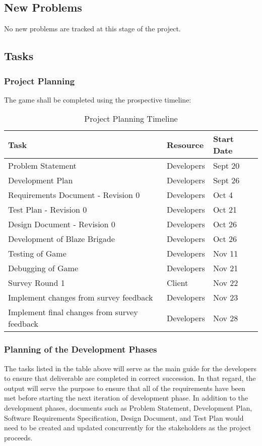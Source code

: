 \documentclass{article}
\begin{document}
\subsection{New Problems}
No new problems are tracked at this stage of the project.

\subsection{Tasks}
\subsubsection{Project Planning}
The game shall be completed using the prospective timeline:

\noindent
\begin{table}[H]
\begin{tabularx}{\textwidth}{llX}
    \toprule
    Task & Resource & Start Date \\
    \midrule
    Problem Statement & Developers  & Sept 20 \\
    Development Plan & Developers  & Sept 26 \\
    Requirements Document - Revision 0 & Developers & Oct 4 \\
    Test Plan - Revision 0 & Developers  & Oct 21 \\
    Design Document - Revision 0 & Developers & Oct 26 \\
    Development of Blaze Brigade & Developers & Oct 26\\
    Testing of Game & Developers & Nov 11\\
    Debugging of Game & Developers & Nov 21 \\
    Survey Round 1 & Client & Nov 22 \\
    Implement changes from survey feedback & Developers & Nov 23 \\
    Implement final changes from survey feedback & Developers & Nov 28 \\
    \bottomrule
\end{tabularx}
\caption{Project Planning Timeline}
\end{table}

\subsubsection{Planning of the Development Phases}

The tasks listed in the table above will serve as the main guide for the developers to ensure that deliverable are completed in correct succession. In that regard, the output will serve the purpose to ensure that all of the requirements have been met before starting the next iteration of development phase. In addition to the development phases, documents such as Problem Statement, Development Plan, Software Requirements Specification, Design Document, and Test Plan would need to be created and updated concurrently for the stakeholders as the project proceeds.
\end{document}
